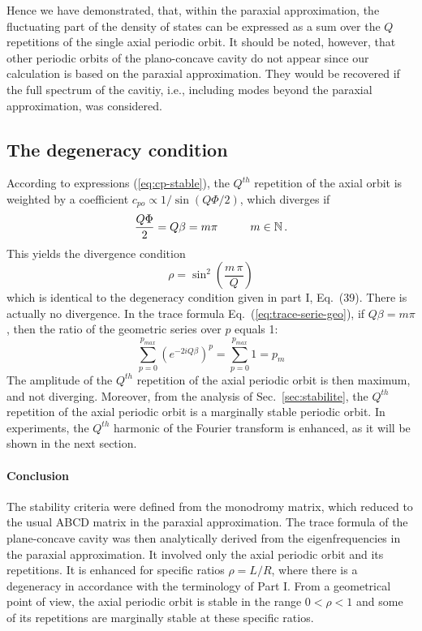 \documentclass[10pt]{iopart}
\begin{document}
Hence we have demonstrated, that, within the paraxial approximation, the fluctuating part of the density of states can be expressed as a sum over the $Q$ repetitions of the single axial periodic orbit. It should be noted, however, that other periodic orbits of the plano-concave cavity do not appear since our calculation is based on the paraxial approximation. They would be recovered if the full spectrum of the cavitiy, i.e., including modes beyond the paraxial approximation, was considered.


\subsection{The degeneracy condition} \label{sec:trace-degenerescence}

According to expressions (\ref{eq:cp-stable}), the $Q^{th}$ repetition of the axial orbit is weighted by a coefficient $c_{po} \propto 1 / \sin(Q \Phi / 2)$, which diverges if
\begin{equation}
\frac{Q\Phi}{2} =Q\beta= m \pi \hspace{1 cm} m \in \mathbb{N} \, .
\end{equation}
This yields the divergence condition
\begin{equation} \label{eq:rho-divergence}
\rho = \sin^2 \left( \frac{m\,\pi}{Q} \right)
\end{equation}
which is identical to the degeneracy condition given in part I, Eq.~(39). There is actually no divergence. In the trace formula Eq.~(\ref{eq:trace-serie-geo}), if $Q\beta=m\pi$, then the
ratio of the geometric series over $p$ equals 1:
\begin{equation}
\sum_{p=0}^{p_{max}}(e^{-2iQ\beta})^p=\sum_{p=0}^{p_{max}}1=p_m
\end{equation}
The amplitude of the $Q^{th}$ repetition of the axial periodic orbit is then maximum, and not diverging. Moreover, from the analysis of Sec.~\ref{sec:stabilite}, the $Q^{th}$ repetition of the axial periodic orbit is a marginally stable periodic orbit.  In experiments, the $Q^{th}$ harmonic of the Fourier transform is enhanced, as it will be shown in the next section.

\paragraph{Conclusion} The stability criteria were defined from the monodromy matrix, which reduced to the usual ABCD matrix in the paraxial approximation. The trace formula of the plane-concave cavity was then analytically derived from the eigenfrequencies in the paraxial approximation. It involved only the axial periodic orbit and its repetitions. It is enhanced for specific ratios $\rho=L/R$, where there is a degeneracy in accordance with the terminology of Part I. From a geometrical point of view, the axial periodic orbit is stable in the range $0<\rho<1$ and some of its repetitions are marginally stable at these specific ratios.
\end{document}

